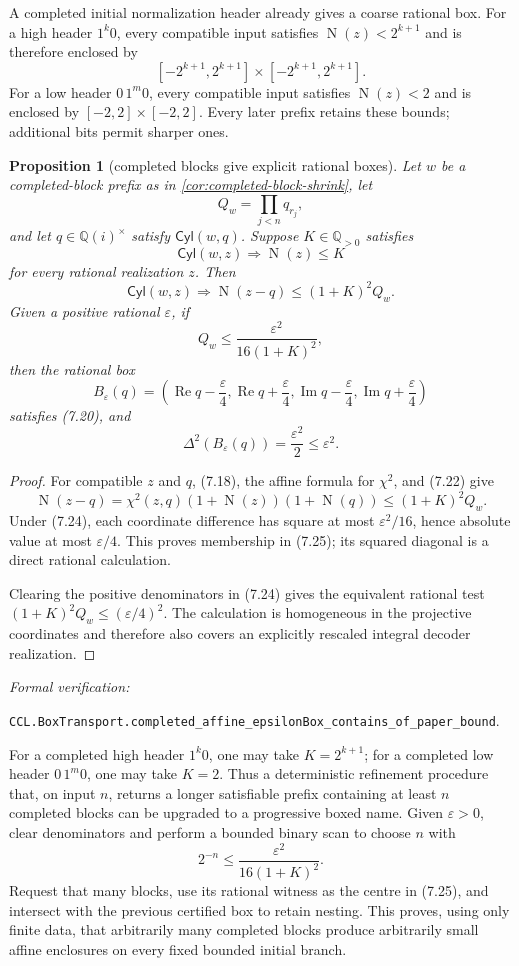 \documentclass[10pt]{article}
\newtheorem{proposition}[theorem]{Proposition}
\theoremstyle{definition}
\theoremstyle{remark}
\newcommand{\Q}{\mathbb{Q}}
\newcommand{\Qi}{\mathbb{Q}(i)}
\newcommand{\Norm}{\operatorname{N}}
\newcommand{\Ree}{\operatorname{Re}}
\newcommand{\Imm}{\operatorname{Im}}
\newcommand{\Cyl}{\mathsf{Cyl}}
\newcommand{\leanref}[1]{\par\smallskip\noindent
  \emph{Formal verification:}\par\nobreak
  {\raggedright\nolinkurl{#1}.\par}}
\begin{document}
A completed initial normalization header already gives a coarse rational box.  For a high header $1^k0$, every compatible input satisfies $\Norm(z)<2^{k+1}$ and is therefore enclosed by
\[
 [-2^{k+1},2^{k+1}]\mathbin{\times}[-2^{k+1},2^{k+1}].
\]
For a low header $0\,1^m0$, every compatible input satisfies $\Norm(z)<2$ and is enclosed by $[-2,2]\times[-2,2]$.  Every later prefix retains these bounds; additional bits permit sharper ones.

\begin{proposition}[completed blocks give explicit rational boxes]\label{prop:projective-quadrance-to-box}
Let $w$ be a completed-block prefix as in \autoref{cor:completed-block-shrink}, let
\[
 Q_w=\prod_{j<n}q_{r_j},
\]
and let $q\in\Qi^\times$ satisfy $\Cyl(w,q)$.  Suppose $K\in\Q_{>0}$ satisfies
\[
 \Cyl(w,z)\Longrightarrow\Norm(z)\le K
\tag{7.22}
\]
for every rational realization $z$.  Then
\[
 \Cyl(w,z)
 \Longrightarrow
 \Norm(z-q)\le(1+K)^2Q_w.
\tag{7.23}
\]
Given a positive rational $\varepsilon$, if
\[
 Q_w\le\frac{\varepsilon^2}{16(1+K)^2},
\tag{7.24}
\]
then the rational box
\[
 B_\varepsilon(q)=
 \left(\Ree q-\frac\varepsilon4,\Ree q+\frac\varepsilon4,
       \Imm q-\frac\varepsilon4,\Imm q+\frac\varepsilon4\right)
\tag{7.25}
\]
satisfies (7.20), and
\[
 \Delta^2(B_\varepsilon(q))=\frac{\varepsilon^2}{2}\le\varepsilon^2.
\]
\end{proposition}

\begin{proof}
For compatible $z$ and $q$, (7.18), the affine formula for $\chi^2$, and (7.22) give
\[
 \Norm(z-q)
 =\chi^2(z,q)(1+\Norm(z))(1+\Norm(q))
 \le(1+K)^2Q_w.
\]
Under (7.24), each coordinate difference has square at most $\varepsilon^2/16$, hence absolute value at most $\varepsilon/4$.  This proves membership in (7.25); its squared diagonal is a direct rational calculation.

Clearing the positive denominators in (7.24) gives the equivalent rational
test $(1+K)^2Q_w\le(\varepsilon/4)^2$.  The calculation is homogeneous in
the projective coordinates and therefore also covers an explicitly rescaled
integral decoder realization.
\end{proof}

\leanref{CCL.BoxTransport.completed_affine_epsilonBox_contains_of_paper_bound}

For a completed high header $1^k0$, one may take $K=2^{k+1}$; for a completed low header $0\,1^m0$, one may take $K=2$.  Thus a deterministic refinement procedure that, on input $n$, returns a longer satisfiable prefix containing at least $n$ completed blocks can be upgraded to a progressive boxed name.  Given $\varepsilon>0$, clear denominators and perform a bounded binary scan to choose $n$ with
\[
 2^{-n}\le\frac{\varepsilon^2}{16(1+K)^2}.
\]
Request that many blocks, use its rational witness as the centre in (7.25), and intersect with the previous certified box to retain nesting.  This proves, using only finite data, that arbitrarily many completed blocks produce arbitrarily small affine enclosures on every fixed bounded initial branch.
\end{document}
